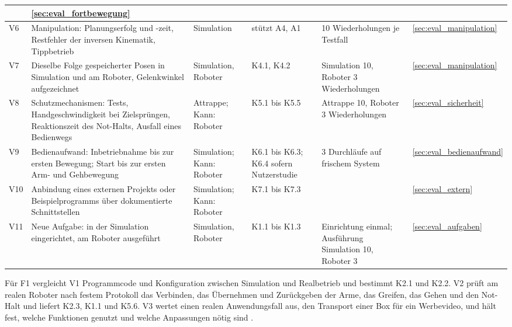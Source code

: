 \begin{table}[htbp]
\begin{tabularx}{\textwidth}{|P{1.4cm}|L|P{2.2cm}|P{1.9cm}|P{2.5cm}|P{1.5cm}|}
        & \ref{sec:eval_fortbewegung}\\\hline
        V6 & Manipulation: Planungserfolg und -zeit, Restfehler der inversen Kinematik, Tippbetrieb & Simulation & stützt A4, A1 & 10 Wiederholungen je Testfall %
        & \ref{sec:eval_manipulation}\\\hline
        V7 & Dieselbe Folge gespeicherter Posen in Simulation und am Roboter, Gelenkwinkel aufgezeichnet & Simulation, Roboter & K4.1, K4.2 & Simulation 10, Roboter 3 Wiederholungen %
        & \ref{sec:eval_manipulation}\\\hline
        V8 & Schutzmechanismen: Tests, Handgeschwindigkeit bei Zielsprüngen, Reaktionszeit des Not-Halts, Ausfall eines Bedienwegs & Attrappe; Kann: Roboter & K5.1 bis K5.5 & Attrappe 10, Roboter 3 Wiederholungen %
        & \ref{sec:eval_sicherheit}\\\hline
        V9 & Bedienaufwand: Inbetriebnahme bis zur ersten Bewegung; Start bis zur ersten Arm- und Gehbewegung & Simulation; Kann: Roboter & K6.1 bis K6.3; K6.4 sofern Nutzerstudie & 3 Durchläufe auf frischem System %
        & \ref{sec:eval_bedienaufwand}\\\hline
        V10 & Anbindung eines externen Projekts oder Beispielprogramms über dokumentierte Schnittstellen & Simulation; Kann: Roboter & K7.1 bis K7.3 &  & \ref{sec:eval_extern}\\\hline
        V11 & Neue Aufgabe: in der Simulation eingerichtet, am Roboter ausgeführt & Simulation, Roboter & K1.1 bis K1.3 & Einrichtung einmal; Ausführung Simulation 10, Roboter 3 %
        & \ref{sec:eval_aufgaben}\\\hline
    \end{tabularx}
\end{table}

Für F1 vergleicht V1 Programmcode und Konfiguration zwischen Simulation und Realbetrieb und bestimmt K2.1 und K2.2.
V2 prüft am realen Roboter nach festem Protokoll das Verbinden, das Übernehmen und Zurückgeben der Arme, das Greifen, das Gehen und den Not-Halt und liefert K2.3, K1.1 und K5.6.
V3 wertet einen realen Anwendungsfall aus, den Transport einer Box für ein Werbevideo, und hält fest, welche Funktionen genutzt und welche Anpassungen nötig sind .

